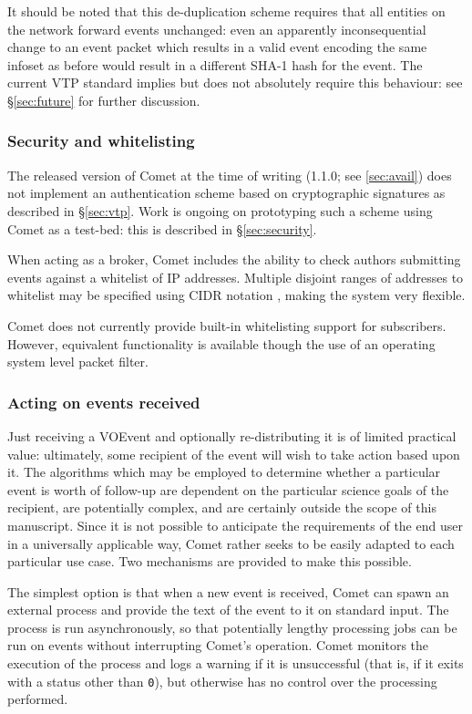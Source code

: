 \documentclass[5p,authoryear]{elsarticle}
\begin{document}
It should be noted that this de-duplication scheme requires that all entities
on the network forward events unchanged: even an apparently inconsequential
change to an event packet which results in a valid event encoding the same
infoset as before would result in a different SHA-1 hash for the event. The
current VTP standard implies but does not absolutely require this behaviour:
see \S\ref{sec:future} for further discussion.

\subsubsection{Security and whitelisting}
\label{sec:design:security}

The released version of Comet at the time of writing (1.1.0; see
\ref{sec:avail}) does not implement an authentication scheme based on
cryptographic signatures as described in \S\ref{sec:vtp}. Work is ongoing on
prototyping such a scheme using Comet as a test-bed: this is described in
\S\ref{sec:security}.

When acting as a broker, Comet includes the ability to check authors
submitting events against a whitelist of IP addresses. Multiple disjoint
ranges of addresses to whitelist may be specified using CIDR notation
\citep{Fuller:1993}, making the system very flexible.

Comet does not currently provide built-in whitelisting support for
subscribers. However, equivalent functionality is available though the use of
an operating system level packet filter.

\subsubsection{Acting on events received}
\label{sec:design:plugin}

Just receiving a VOEvent and optionally re-distributing it is of limited
practical value: ultimately, some recipient of the event will wish to take
action based upon it. The algorithms which may be employed to determine
whether a particular event is worth of follow-up are dependent on the
particular science goals of the recipient, are potentially complex, and are
certainly outside the scope of this manuscript. Since it is not possible to
anticipate the requirements of the end user in a universally applicable way,
Comet rather seeks to be easily adapted to each particular use case. Two
mechanisms are provided to make this possible.

The simplest option is that when a new event is received, Comet can spawn an
external process and provide the text of the event to it on standard input.
The process is run asynchronously, so that potentially lengthy processing jobs
can be run on events without interrupting Comet's operation. Comet monitors
the execution of the process and logs a warning if it is unsuccessful (that
is, if it exits with a status other than \texttt{0}), but otherwise has no
control over the processing performed.
\end{document}

